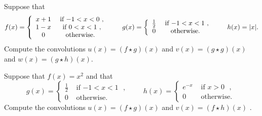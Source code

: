 \documentclass[11pt]{article}
\begin{document}
\begin{exercise}
    Suppose that
    \begin{align*}
        f(x) = \left\{\begin{array}{cc} x+1 & \text{ if $-1 < x < 0$ }, \\  1-x & \text{ if $ 0 < x < 1$ }, \\  0 & \text{ otherwise. } \end{array}\right.
        \qquad 
        g(x) = \left\{\begin{array}{cc} \frac 1 2 & \text{ if $-1 < x < 1$ }, \\ 0 & \text{ otherwise. } \end{array}\right.
        \qquad 
        h(x) = |x|
        .
    \end{align*}
    Compute the convolutions $u(x) = (f \star g)(x)$ and $v(x) = (g \star g)(x)$ and $w(x) = (g \star h)(x)$.
\end{exercise}
\begin{solution} 
\end{solution}



\begin{exercise}
    Suppose that $f(x) = x^2$ and that
    \[
        g(x) = \left\{\begin{array}{cc} \frac 1 2 & \text{ if $-1 < x < 1$ }, \\ 0 & \text{ otherwise. } \end{array}\right.
        \qquad 
        h(x) = \left\{\begin{array}{cc} e^{-x} & \text{ if $x > 0$ }, \\ 0 & \text{ otherwise. } \end{array}\right.
    \]
    Compute the convolutions $u(x) = (f \star g)(x)$ and $v(x) = (f \star h)(x)$ .
\end{exercise}

\begin{solution}     
\end{solution}
\end{document}
